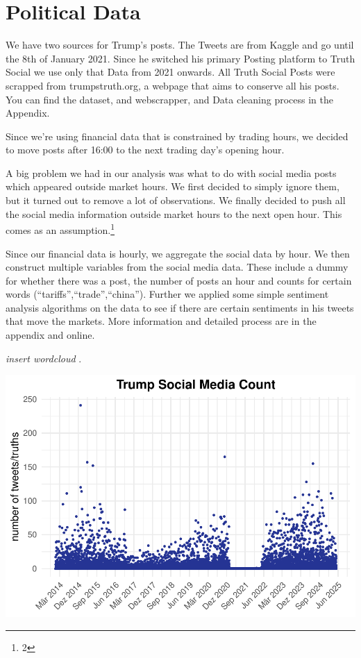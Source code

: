 \documentclass[
]{book}
\begin{document}
\section{Political Data}\label{political-data}

We have two sources for Trump's posts. The Tweets are from Kaggle
\citet{DonaldTrumpTweets} and go until the 8th of January 2021. Since he
switched his primary Posting platform to Truth Social we use only that
Data from 2021 onwards. All Truth Social Posts were scrapped from
trumpstruth.org, a webpage that aims to conserve all his posts. You can
find the dataset, and webscrapper, and Data cleaning process in the
Appendix.

Since we're using financial data that is constrained by trading hours,
we decided to move posts after 16:00 to the next trading day's opening
hour.

A big problem we had in our analysis was what to do with social media posts
which appeared outside market hours. We first decided to simply ignore them, but
it turned out to remove a lot of observations. We finally decided to push all the
social media information outside market hours to the next open hour. This comes
as an assumption.\footnote{2}

Since our financial data is hourly, we aggregate the social data by hour. We
then construct multiple variables from the social media data. These include
a dummy for whether there was a post, the number of posts an hour and counts
for certain words (``tariffs'',``trade'',``china''). Further we applied some simple
sentiment analysis algorithms on the data to see if there are certain sentiments
in his tweets that move the markets. More information and detailed process are in
the appendix and online.

{ \emph{insert wordcloud} }.

\includegraphics{_main_files/figure-latex/social plots-1.pdf}
\end{document}
